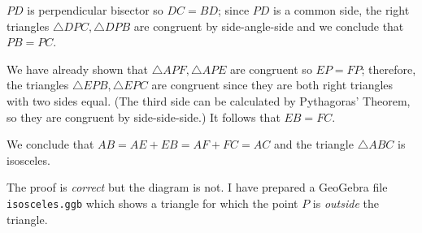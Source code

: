 \documentclass[11pt,a4paper]{article}
\begin{document}
$PD$ is perpendicular bisector so $DC=BD$; since $PD$ is a common side, the right triangles $\triangle DPC, \triangle DPB$ are congruent by side-angle-side and we conclude that $PB=PC$.

We have already shown that $\triangle APF, \triangle APE$ are congruent so $EP=FP$; therefore, the triangles $\triangle EPB, \triangle EPC$ are congruent since they are both right triangles with two sides equal. (The third side can be calculated by Pythagoras' Theorem, so they are congruent by side-side-side.) It follows that $EB=FC$.

We conclude that $AB= AE+EB=AF+FC =AC$ and the triangle $\triangle ABC$ is isosceles.

The proof is \emph{correct} but the diagram is not. I have prepared a GeoGebra file \texttt{isosceles.ggb} which shows a triangle for which the point $P$ is \emph{outside} the triangle.



\newpage



\end{document}
